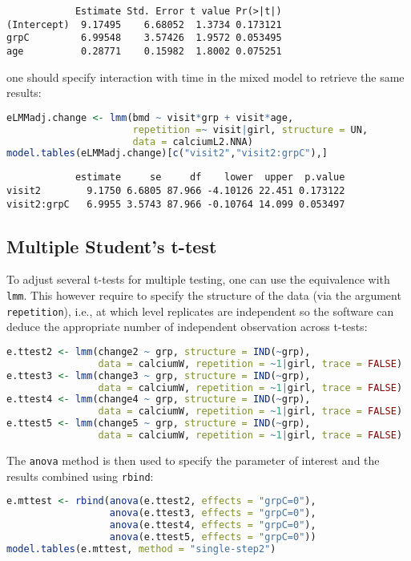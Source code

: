 \documentclass[12pt]{article}
\begin{document}
\label{}
\begin{verbatim}
            Estimate Std. Error t value Pr(>|t|)
(Intercept)  9.17495    6.68052  1.3734 0.173121
grpC         6.99548    3.57426  1.9572 0.053495
age          0.28771    0.15982  1.8002 0.075251
\end{verbatim}


one should specify interaction with time in the mixed model to
retrieve the same results:
\begin{lstlisting}[language=r,numbers=none]
eLMMadj.change <- lmm(bmd ~ visit*grp + visit*age,
                      repetition =~ visit|girl, structure = UN,
                      data = calciumL2.NNA)
model.tables(eLMMadj.change)[c("visit2","visit2:grpC"),]
\end{lstlisting}

\label{}
\begin{verbatim}
            estimate     se     df    lower  upper  p.value
visit2        9.1750 6.6805 87.966 -4.10126 22.451 0.173122
visit2:grpC   6.9955 3.5743 87.966 -0.10764 14.099 0.053497
\end{verbatim}



\clearpage
\subsection{Multiple Student's t-test}
\label{sec:org79e5e00}

To adjust several t-tests for multiple testing, one can use the
equivalence with \texttt{lmm}. This however require to specify the structure
of the data (via the argument \texttt{repetition}), i.e., at which level
replicates are independent so the software can deduce the appropriate
number of independent observation across t-tests:

\begin{lstlisting}[language=r,numbers=none]
e.ttest2 <- lmm(change2 ~ grp, structure = IND(~grp), 
                data = calciumW, repetition = ~1|girl, trace = FALSE)
e.ttest3 <- lmm(change3 ~ grp, structure = IND(~grp), 
                data = calciumW, repetition = ~1|girl, trace = FALSE)
e.ttest4 <- lmm(change4 ~ grp, structure = IND(~grp), 
                data = calciumW, repetition = ~1|girl, trace = FALSE)
e.ttest5 <- lmm(change5 ~ grp, structure = IND(~grp), 
                data = calciumW, repetition = ~1|girl, trace = FALSE)
\end{lstlisting}

\noindent The \texttt{anova} method is then used to specify the parameter of
 interest and the results combined using \texttt{rbind}:
\begin{lstlisting}[language=r,numbers=none]
e.mttest <- rbind(anova(e.ttest2, effects = "grpC=0"),
                  anova(e.ttest3, effects = "grpC=0"),
                  anova(e.ttest4, effects = "grpC=0"),
                  anova(e.ttest5, effects = "grpC=0"))
model.tables(e.mttest, method = "single-step2")
\end{lstlisting}
\end{document}
